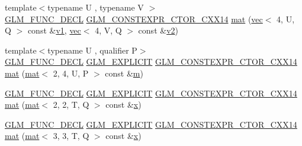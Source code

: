\begin{DoxyCompactItemize}
\item 
{\footnotesize template$<$typename U , typename V $>$ }\\\mbox{\hyperlink{setup_8hpp_ab2d052de21a70539923e9bcbf6e83a51}{G\+L\+M\+\_\+\+F\+U\+N\+C\+\_\+\+D\+E\+CL}} \mbox{\hyperlink{setup_8hpp_a0900f9145e68bf6061b6f5e7be3fa751}{G\+L\+M\+\_\+\+C\+O\+N\+S\+T\+E\+X\+P\+R\+\_\+\+C\+T\+O\+R\+\_\+\+C\+X\+X14}} \mbox{\hyperlink{structglm_1_1mat_3_012_00_014_00_01_t_00_01_q_01_4_aa3fa882e6b26c7fc035f8c17e17ff721}{mat}} (\mbox{\hyperlink{structglm_1_1vec}{vec}}$<$ 4, U, Q $>$ const \&\mbox{\hyperlink{_s_d_l__opengl__glext_8h_a435c176a02c061b43e19bdf7c86cceae}{v1}}, \mbox{\hyperlink{structglm_1_1vec}{vec}}$<$ 4, V, Q $>$ const \&\mbox{\hyperlink{_s_d_l__opengl__glext_8h_a0928f6d0f0f794ba000a21dfae422136}{v2}})
\item 
{\footnotesize template$<$typename U , qualifier P$>$ }\\\mbox{\hyperlink{setup_8hpp_ab2d052de21a70539923e9bcbf6e83a51}{G\+L\+M\+\_\+\+F\+U\+N\+C\+\_\+\+D\+E\+CL}} \mbox{\hyperlink{setup_8hpp_a6c74f5a5e7b134ab69023ff9a30d4d5d}{G\+L\+M\+\_\+\+E\+X\+P\+L\+I\+C\+IT}} \mbox{\hyperlink{setup_8hpp_a0900f9145e68bf6061b6f5e7be3fa751}{G\+L\+M\+\_\+\+C\+O\+N\+S\+T\+E\+X\+P\+R\+\_\+\+C\+T\+O\+R\+\_\+\+C\+X\+X14}} \mbox{\hyperlink{structglm_1_1mat_3_012_00_014_00_01_t_00_01_q_01_4_a9f8b14350b606e58d0bf69a7cd35bf45}{mat}} (\mbox{\hyperlink{structglm_1_1mat}{mat}}$<$ 2, 4, U, P $>$ const \&\mbox{\hyperlink{_s_d_l__opengl__glext_8h_af593500c283bf1a787a6f947f503a5c2}{m}})
\item 
\mbox{\hyperlink{setup_8hpp_ab2d052de21a70539923e9bcbf6e83a51}{G\+L\+M\+\_\+\+F\+U\+N\+C\+\_\+\+D\+E\+CL}} \mbox{\hyperlink{setup_8hpp_a6c74f5a5e7b134ab69023ff9a30d4d5d}{G\+L\+M\+\_\+\+E\+X\+P\+L\+I\+C\+IT}} \mbox{\hyperlink{setup_8hpp_a0900f9145e68bf6061b6f5e7be3fa751}{G\+L\+M\+\_\+\+C\+O\+N\+S\+T\+E\+X\+P\+R\+\_\+\+C\+T\+O\+R\+\_\+\+C\+X\+X14}} \mbox{\hyperlink{structglm_1_1mat_3_012_00_014_00_01_t_00_01_q_01_4_a1248b3992782f755da5abbcd9ee09d0b}{mat}} (\mbox{\hyperlink{structglm_1_1mat}{mat}}$<$ 2, 2, T, Q $>$ const \&\mbox{\hyperlink{_s_d_l__opengl_8h_ad0e63d0edcdbd3d79554076bf309fd47}{x}})
\item 
\mbox{\hyperlink{setup_8hpp_ab2d052de21a70539923e9bcbf6e83a51}{G\+L\+M\+\_\+\+F\+U\+N\+C\+\_\+\+D\+E\+CL}} \mbox{\hyperlink{setup_8hpp_a6c74f5a5e7b134ab69023ff9a30d4d5d}{G\+L\+M\+\_\+\+E\+X\+P\+L\+I\+C\+IT}} \mbox{\hyperlink{setup_8hpp_a0900f9145e68bf6061b6f5e7be3fa751}{G\+L\+M\+\_\+\+C\+O\+N\+S\+T\+E\+X\+P\+R\+\_\+\+C\+T\+O\+R\+\_\+\+C\+X\+X14}} \mbox{\hyperlink{structglm_1_1mat_3_012_00_014_00_01_t_00_01_q_01_4_a7ff54549fe4e95e2d8b09f096bd80f13}{mat}} (\mbox{\hyperlink{structglm_1_1mat}{mat}}$<$ 3, 3, T, Q $>$ const \&\mbox{\hyperlink{_s_d_l__opengl_8h_ad0e63d0edcdbd3d79554076bf309fd47}{x}})

\end{DoxyCompactItemize}
